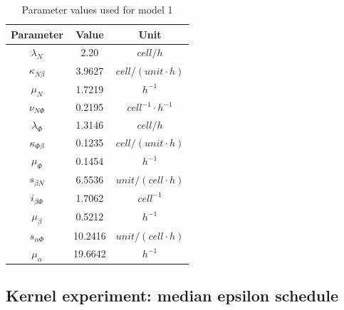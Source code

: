 \documentclass[12pt,a4paper]{report}
\begin{document}
\begin{table}[h!]
    \centering
    \begin{tabular}{|c c c|} 
     \hline
     Parameter & Value & Unit\\ [0.5ex] 
     \hline\hline
     $\lambda_N$ & 2.20 & $cell/h$  \\ 
     $\kappa_{N\beta}$ & 3.9627 & $cell/(unit\cdotp h)$\\
     $\mu_N$ & 1.7219 & $h^{-1}$\\
     $\nu_{N\Phi}$ & 0.2195 & $cell^{-1}\cdotp h^{-1}$ \\
     \hline
     $\lambda_\Phi$ & 1.3146 & $cell/h$ \\
     $\kappa_{\Phi\beta}$ & 0.1235 & $cell/(unit\cdotp h)$ \\
     $\mu_\Phi$ & 0.1454 & $h^{-1}$ \\
     \hline
     $s_{\beta N}$ & 6.5536 & $unit/(cell\cdotp h)$ \\
     $i_{\beta\Phi}$ & 1.7062 & $cell^{-1}$ \\
     $\mu_\beta$ & 0.5212 & $h^{-1}$ \\
     \hline
     $s_{\alpha\Phi}$ & 10.2416 & $unit/(cell\cdotp h)$ \\
     $\mu_\alpha$ & 19.6642 & $h^{-1}$ \\
    [1ex] 
     \hline
    \end{tabular}
    \caption{Parameter values used for model 1}
    \label{table:m1}
\end{table}

\subsection{Kernel experiment: median epsilon schedule}
\end{document}
